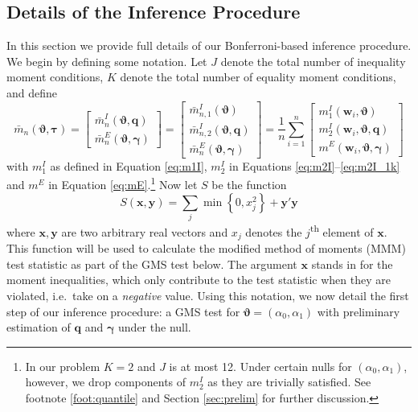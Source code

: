 \subsection{Details of the Inference Procedure}
\label{sec:details}
In this section we provide full details of our Bonferroni-based inference procedure.
We begin by defining some notation.
Let $J$ denote the total number of inequality moment conditions, $K$ denote the total number of equality moment conditions, and define
\begin{equation}
\bar{m}_n(\boldsymbol{\vartheta}, \boldsymbol{\tau}) = \left[
\begin{array}{c}
  \bar{m}_n^I(\boldsymbol{\vartheta}, \mathbf{q}) \\
  \bar{m}_n^E(\boldsymbol{\vartheta}, \boldsymbol{\gamma}) 
\end{array}
\right] = 
\left[
\begin{array}{l}
  \bar{m}_{n,1}^I(\boldsymbol{\vartheta})\\
  \bar{m}_{n,2}^I(\boldsymbol{\vartheta}, \mathbf{q}) \\
  \bar{m}_n^E(\boldsymbol{\vartheta}, \boldsymbol{\gamma}) 
\end{array}
\right] = 
\frac{1}{n} \sum_{i=1}^n
\left[\begin{array}{l}
    m^I_1(\mathbf{w}_i,\boldsymbol{\vartheta})\\
    m^I_2(\mathbf{w}_i,\boldsymbol{\vartheta}, \mathbf{q}) \\
    m^E(\mathbf{w}_i,\boldsymbol{\vartheta}, \boldsymbol{\gamma}) 
\end{array}\right]
\label{eq:mbar_def}
\end{equation}
with $m_1^I$ as defined in Equation \ref{eq:m1I}, $m_2^I$ in Equations \ref{eq:m2I}--\ref{eq:m2I_1k} and $m^E$ in Equation \ref{eq:mE}.\footnote{In our problem $K=2$ and $J$ is at most 12. Under certain nulls for $(\alpha_0, \alpha_1)$, however, we drop components of $m^I_2$ as they are trivially satisfied. See footnote \ref{foot:quantile} and Section \ref{sec:prelim} for further discussion.}
Now let $S$ be the function
\begin{equation}
  S(\mathbf{x}, \mathbf{y}) = \sum_{j}\min\left\{ 0, 
  x_j^2 \right\} + \mathbf{y}'\mathbf{y} 
    \label{eq:MMM}
\end{equation}
where $\mathbf{x}, \mathbf{y}$ are two arbitrary real vectors and $x_j$ denotes the $j$\textsuperscript{th} element of $\mathbf{x}$.
This function will be used to calculate the modified method of moments (MMM) test statistic as part of the GMS test below.
The argument $\mathbf{x}$ stands in for the moment inequalities, which only contribute to the test statistic when they are violated, i.e.\ take on a \emph{negative} value.
Using this notation, we now detail the first step of our inference procedure: a GMS test for $\boldsymbol{\vartheta} = (\alpha_0, \alpha_1)$ with preliminary estimation of $\mathbf{q}$ and $\boldsymbol{\gamma}$ under the null.


